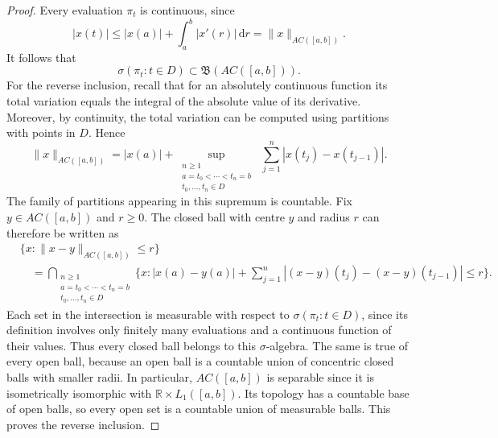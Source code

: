 \documentclass[reqno]{amsart}
\theoremstyle{plain}
\numberwithin{equation}{section}
\numberwithin{definition}{section}
\newcommand\RR{\ensuremath{\mathbb{R}}}
\newcommand{\dd}{\ensuremath{\mathrm{d}}}
\begin{document}
{\begin{proof}
Every evaluation $\pi_t$ is continuous, since
\begin{equation*}
    |x(t)|
    \le
    |x(a)|+\int_a^b|x'(r)|\,\dd r
    =
    \|x\|_{AC([a,b])}.
\end{equation*}
It follows that
\begin{equation*}
    \sigma(\pi_t:t\in D)
    \subset
    \mathfrak{B}(AC([a,b])).
\end{equation*}
For the reverse inclusion, recall that for an absolutely
continuous function its total variation equals the integral
of the absolute value of its derivative. Moreover, by
continuity, the total variation can be computed using
partitions with points in $D$. Hence
\begin{equation*}
    \|x\|_{AC([a,b])}
    =
    |x(a)|
    +
    \sup_{\substack{
        n\ge1 \\ a=t_0<\cdots<t_n=b\\
        t_0,\ldots,t_n\in D
    }} \, \, 
    \sum_{j=1}^n|x(t_j)-x(t_{j-1})|.
\end{equation*}
The family of partitions appearing in this supremum is
countable. Fix $y\in AC([a,b])$ and $r\ge0$. The closed ball with centre $y$ and radius $r$ can therefore
be written as 
\begin{equation*}
    \begin{aligned}
        &\{x:\|x-y\|_{AC([a,b])}\le r\}\\
        &\quad=
        \bigcap_{\substack{
            n\ge1\\  a=t_0<\cdots<t_n=b\\
            t_0,\ldots,t_n\in D
        }}
        \Big\{
            x:
            |x(a)-y(a)|
            +
            \sum_{j=1}^n
            |
                (x-y)(t_j)-(x-y)(t_{j-1})
            |
            \le r
        \Big\}.
    \end{aligned}
\end{equation*}
Each set in the intersection is measurable with respect
to $\sigma(\pi_t:t\in D)$, since its definition involves
only finitely many evaluations and a continuous function
of their values. Thus every closed ball belongs to this
$\sigma$-algebra. The same is true of every open ball,
because an open ball is a countable union of concentric
closed balls with smaller radii. 
In particular, $AC([a,b])$ is separable since it is isometrically isomorphic with $\RR\times L_1([a,b])$.
Its topology has a countable base of open balls, so every
open set is a countable union of measurable balls.
This proves the reverse inclusion.
\end{proof}

}
\end{document}
